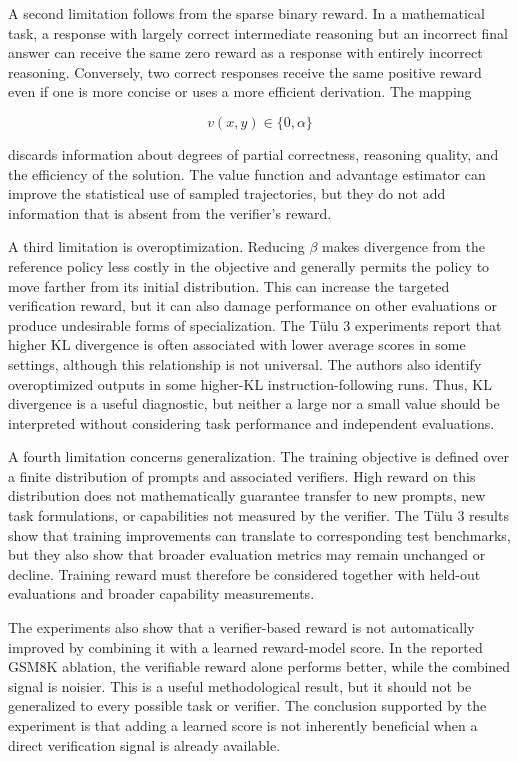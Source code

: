 A second limitation follows from the sparse binary reward. In a mathematical
task, a response with largely correct intermediate reasoning but an
incorrect final answer can receive the same zero reward as a response with
entirely incorrect reasoning. Conversely, two correct responses receive
the same positive reward even if one is more concise or uses a more
efficient derivation. The mapping

\begin{equation}
    v(x,y)\in\{0,\alpha\}
    \label{eq:rlvr-sparse-reward}
\end{equation}

discards information about degrees of partial correctness, reasoning quality,
and the efficiency of the solution. The value function and advantage
estimator can improve the statistical use of sampled trajectories, but
they do not add information that is absent from the verifier's reward.

A third limitation is overoptimization. Reducing \(\beta\) makes divergence
from the reference policy less costly in the objective and generally permits
the policy to move farther from its initial distribution. This can increase
the targeted verification reward, but it can also damage performance on
other evaluations or produce undesirable forms of specialization. The
Tülu 3 experiments report that higher KL divergence is often associated
with lower average scores in some settings, although this relationship is
not universal. The authors also identify overoptimized outputs in some
higher-KL instruction-following runs. Thus, KL divergence is a useful
diagnostic, but neither a large nor a small value should be interpreted
without considering task performance and independent evaluations.

A fourth limitation concerns generalization. The training objective is
defined over a finite distribution of prompts and associated verifiers.
High reward on this distribution does not mathematically guarantee transfer
to new prompts, new task formulations, or capabilities not measured by the
verifier. The Tülu 3 results show that training improvements can translate
to corresponding test benchmarks, but they also show that broader evaluation
metrics may remain unchanged or decline. Training reward must therefore be
considered together with held-out evaluations and broader capability
measurements.

The experiments also show that a verifier-based reward is not automatically
improved by combining it with a learned reward-model score. In the reported
GSM8K ablation, the verifiable reward alone performs better, while the
combined signal is noisier. This is a useful methodological result, but it
should not be generalized to every possible task or verifier. The conclusion
supported by the experiment is that adding a learned score is not inherently
beneficial when a direct verification signal is already available.


